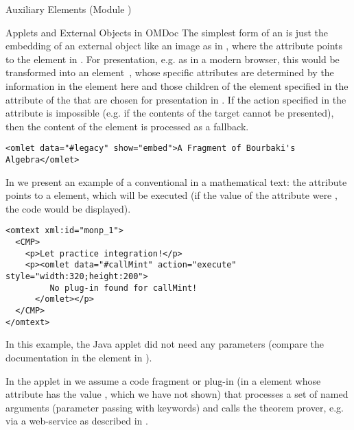\begin{tchapter}[id=ext,short=Auxiliary Elements]{Auxiliary Elements (Module {})}
\begin{tsection}[id=applets]{Applets and External Objects in OMDoc}
  The simplest form of an {} is just the embedding of an external object
  like an image as in {}, where the {}
  attribute points to the {} element in {}. For
  presentation, e.g. as {\xhtml} in a modern browser, this would be transformed into an
  {} element~\cite{W3C:xhtml2000}, whose specific attributes
  are determined by the information in the {} element here and those
  {} children of the {} element specified in the
  {} attribute of the {} that are chosen for
  presentation in {\xhtml}. If the action specified in the {}
  attribute is impossible (e.g. if the contents of the {} target
  cannot be presented), then the content of the {} element is processed as
  a fallback.

\begin{lstlisting}[label=lst:omlet-image,
  caption={An {\element{omlet}} for an Image},index={omlet}]
<omlet data="#legacy" show="embed">A Fragment of Bourbaki's Algebra</omlet>
\end{lstlisting}

In {} we present an example of a conventional
{} in a mathematical text: the {}
attribute points to a {} element, which will be executed (if the
value of the {} attribute were
{}, the code would be displayed).

\begin{lstlisting}[label=lst:omlet1,
  caption={An {\element{omlet}} that Calls the Java Applet from {\mylstref{callMint}}.},
  index={omlet}]
<omtext xml:id="monp_1">    
  <CMP>
    <p>Let practice integration!</p>
    <p><omlet data="#callMint" action="execute" style="width:320;height:200">
         No plug-in found for callMint!
      </omlet></p>
  </CMP>
</omtext>
\end{lstlisting}

In this example, the Java applet did not need any parameters (compare the
documentation in the {} element in {}). 

In the applet in {} we assume a code fragment or plug-in (in a
{} element whose {} attribute has the value
{}, which we have not shown) that processes a set of named arguments
(parameter passing with keywords) and calls the theorem prover, e.g. via a web-service as
described in {}.


\end{tsection}
\end{tchapter}
